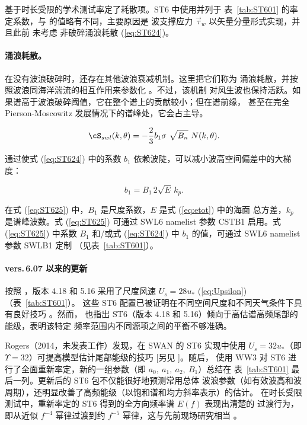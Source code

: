 \citet{art:RBW12} 基于时长受限的学术测试率定了耗散项。{\code ST6} 中使用并列于
表~\ref{tab:ST601} 的率定系数，与 \citet{art:RBW12} 的值略有不同，主要原因是
波支撑应力 $\vec{\tau}_w$ 以矢量分量形式实现，并且此前 \citet{art:RBW12} 未考虑
非破碎涌浪耗散 (\ref{eq:ST624})。

\paragraph{涌浪耗散。} 在没有波浪破碎时，还存在其他波浪衰减机制。这里把它们称为
涌浪耗散，并按照波浪同海洋湍流的相互作用来参数化 \citep{bk:Bab11}。不过，该机制
对风生波也保持活跃。如果谱高于波浪破碎阈值，它在整个谱上的贡献较小；但在谱前缘，
甚至在完全 Pierson-Moscowitz 发展情况下的谱峰处，它会占主导。

\begin{equation}\label{eq:ST624}
  \cS_{swl}(k,\theta) = -\frac{2}{3}b_1 \sigma\ \sqrt{B_n}\ N(k,\theta).
\end{equation}

\noindent
通过使式 (\ref{eq:ST624}) 中的系数 $b_1$ 依赖波陡，可以减小波高空间偏差中的大梯度：

\begin{equation}\label{eq:ST625}
   b_1 = B_1 \, 2\sqrt{E}\,k_p .
\end{equation}

在式 (\ref{eq:ST625}) 中，$B_1$ 是尺度系数，$E$ 是式 (\ref{eq:etot}) 中的海面
总方差，$k_p$ 是谱峰波数。式 (\ref{eq:ST625}) 可通过 {\F SWL6} namelist 参数
{\code CSTB1} 启用。式 (\ref{eq:ST625}) 中系数 $B_1$ 和/或式 (\ref{eq:ST624})
中 $b_1$ 的值，可通过 {\F SWL6} namelist 参数 {\code SWLB1} 定制
（见表~\ref{tab:ST601}）。

\noindent
\paragraph{vers.\,6.07 以来的更新} 按照 \citet{art:RBW12}，版本 4.18 和 5.16
采用了尺度风速 $U_s = 28u_{\ast}$ (\ref{eq:Upsilon})（表~\ref{tab:ST601}）。
这些 {\code ST6} 配置已被证明在不同空间尺度和不同天气条件下具有良好技巧
\citep[e.g.][]{art:ZBRY15, liu2017}。然而，\citet[][their Fig. 5]{art:ZBRY15}
也指出 {\code ST6}（版本 4.18 和 5.16）倾向于高估谱高频尾部的能级，表明该特定
频率范围内不同源项之间的平衡不够准确。

Rogers（2014，未发表工作）发现，在 SWAN 的 {\code ST6} 实现中使用
$U_s = 32u_{\ast}$（即 $\Upsilon = 32$）可提高模型估计尾部能级的技巧
[另见 \citet{Rogers2017}]。随后，\citet{Liu2019} 使用 WW3 对 {\code ST6}
进行了全面重新率定，新的一组参数（即 $a_0,\ a_1,\ a_2,\ B_1$）总结在
表~\ref{tab:ST601} 最后一列。更新后的 {\code ST6} 包不仅能很好地预测常用总体
波浪参数（如有效波高和波周期），还明显改善了高频能级（以饱和谱和均方斜率表示）的估计。
在时长受限测试中，重新率定的 {\code ST6} 得到的全方向频率谱 $E(f)$ 表现出清楚的
过渡行为，即从近似 $f^{-4}$ 幂律过渡到约 $f^{-5}$ 幂律，这与先前现场研究相当
\citep{Forristall1981}。

